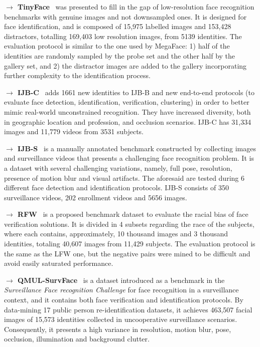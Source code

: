 \documentclass[class=report, crop=false, a4paper, 12pt]{standalone}
\begin{document}
\vspace{0.7\baselineskip}
\noindent\textbf{$\rightarrow$ TinyFace}~\autocite{chengLowResolutionFaceRecognition2019} was presented to fill in the gap of low-resolution face recognition benchmarks with genuine images and not downsampled ones. It is designed for face identification, and is composed of 15,975 labelled images and 153,428 distractors, totalling 169,403 low resolution images, from 5139 identities. The evaluation protocol is similar to the one used by MegaFace: 1) half of the identities are randomly sampled by the probe set and the other half by the gallery set, and 2) the distractor images are added to the gallery incorporating further complexity to the identification process.

\vspace{0.7\baselineskip}
\noindent\textbf{$\rightarrow$ IJB-C}~\autocite{mazeIARPAJanusBenchmark2018} adds 1661 new identities to IJB-B and new end-to-end protocols (to evaluate face detection, identification, verification, clustering) in order to better mimic real-world unconstrained recognition. They have increased diversity, both in geographic location and profession, and occlusion scenarios. IJB-C has 31,334 images and 11,779 videos from 3531 subjects.

\vspace{0.7\baselineskip}
\noindent\textbf{$\rightarrow$ IJB-S}~\autocite{kalkaIJBIARPAJanus2018} is a manually annotated benchmark constructed by collecting images and surveillance videos that presents a challenging face recognition problem. It is a dataset with several challenging variations, namely, full pose, resolution, presence of motion blur and visual artifacts. The aforesaid are tested during 6 different face detection and identification protocols. IJB-S consists of 350 surveillance videos, 202 enrollment videos and 5656 images. 

\vspace{0.7\baselineskip}
\noindent\textbf{$\rightarrow$ RFW}~\autocite{wangRacialFacesWild2019} is a proposed benchmark dataset to evaluate the racial bias of face verification solutions. It is divided in 4 subsets regarding the race of the subjects, where each contains, approximately, 10 thousand images and 3 thousand identities, totaling 40,607 images from 11,429 subjects. The evaluation protocol is the same as the LFW one, but the negative pairs were mined to be difficult and avoid easily saturated performance.

\vspace{0.7\baselineskip}
\noindent\textbf{$\rightarrow$ QMUL-SurvFace}~\autocite{chengSurveillanceFaceRecognition2018} is a dataset introduced as a benchmark in the \textit{Surveillance Face recognition Challenge} for face recognition in a surveillance context, and it contains both face verification and identification protocols. By data-mining 17 public person re-identification datasets, it achieves 463,507 facial images of 15,573 identities collected in uncooperative surveillance scenarios. Consequently, it presents a high variance in resolution, motion blur, pose, occlusion, illumination and background clutter.
\end{document}
